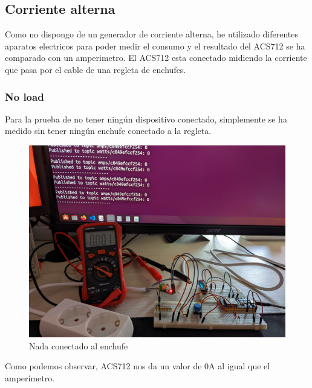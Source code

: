 \begin{titlepage}
\subsection{Corriente alterna}
Como no dispongo de un generador de corriente alterna, he utilizado diferentes aparatos electricos para poder medir el consumo y el resultado del ACS712 se ha comparado con un amperimetro. El ACS712 esta conectado midiendo la corriente que pasa por el cable de una regleta de enchufes.\\
\subsubsection{No load}
Para la prueba de no tener ningún dispositivo conectado, simplemente se ha medido sin tener ningún enchufe conectado a la regleta.\\
\begin{figure}[h!]
	\centering
	\includegraphics[width=1\textwidth]{imagenes/AC_noload.jpg}
	\caption{Nada conectado al enchufe}
\end{figure}
Como podemos observar, ACS712 nos da un valor de 0A al igual que el amperímetro.


\end{titlepage}
